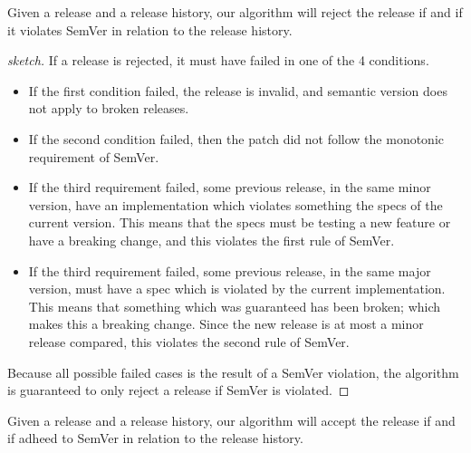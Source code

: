 \begin{theorem}[Soundness]
Given a release and a release history, our algorithm will reject the release if
and if it violates SemVer in relation to the release history.
\end{theorem}

\begin{proof}[sketch]
If a release is rejected, it must have failed in one of the 4 conditions. 
\begin{itemize}
  \item If the first condition failed, the release is invalid, and semantic
      version does not apply to broken releases. 
  \item If the second condition failed, then the patch did not follow the
      monotonic requirement of SemVer. 
  \item If the third requirement failed, some previous release, in the same
      minor version, have an implementation which violates something the specs
      of the current version. This means that the specs must be testing a new
      feature or have a breaking change, and this violates the first rule of
      SemVer.
  \item If the third requirement failed, some previous release, in the same
      major version,  must have a spec which is violated by the current
      implementation. This means that something which was guaranteed has been
      broken; which makes this a breaking change. Since the new release is at
      most a minor release compared, this violates the second rule of SemVer.
\end{itemize}
Because all possible failed cases is the result of a SemVer violation, the
algorithm is guaranteed to only reject a release if SemVer is violated.
\end{proof}

\begin{theorem}[Completness]
Given a release and a release history, our algorithm will accept the release if
and if adheed to SemVer in relation to the release history.
\end{theorem}

